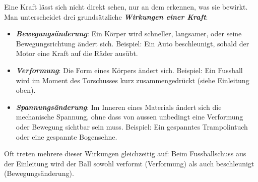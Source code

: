 \documentclass[addpoints,11pt,a4paper]{exam}
\begin{document}
\begin{theoriebox}
Eine Kraft lässt sich nicht direkt sehen, nur an dem erkennen, was sie
bewirkt. Man unterscheidet drei grundsätzliche \textbf{\emph{Wirkungen
einer Kraft}}:

\begin{itemize}[leftmargin=1.2cm,itemsep=0.35em]
  \item \textbf{\emph{Bewegungsänderung}}: Ein Körper wird schneller,
  langsamer, oder seine Bewegungsrichtung ändert sich. Beispiel: Ein Auto
  beschleunigt, sobald der Motor eine Kraft auf die Räder ausübt.
  \item \textbf{\emph{Verformung}}: Die Form eines Körpers ändert sich.
  Beispiel: Ein Fussball wird im Moment des Torschusses kurz zusammengedrückt
  (siehe Einleitung oben).
  \item \textbf{\emph{Spannungsänderung}}: Im Inneren eines Materials
  ändert sich die mechanische Spannung, ohne dass von aussen unbedingt eine
  Verformung oder Bewegung sichtbar sein muss. Beispiel: Ein gespanntes
  Trampolintuch oder eine gespannte Bogensehne.
\end{itemize}

Oft treten mehrere dieser Wirkungen gleichzeitig auf: Beim Fussballschuss
aus der Einleitung wird der Ball sowohl verformt (Verformung) als auch
beschleunigt (Bewegungsänderung).
\end{theoriebox}
\end{document}

